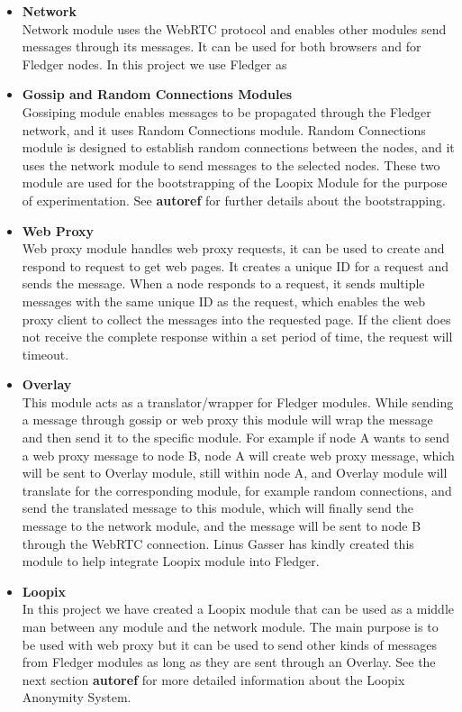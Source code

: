 \documentclass[a4paper,11pt,oneside]{report}
\begin{document}
\begin{itemize}
    \item \textbf{Network}\\
    Network module uses the WebRTC protocol and enables other modules send messages through its messages. It can be used for both browsers and for Fledger nodes. In this project we use Fledger as 
    \item \textbf{Gossip and Random Connections Modules} \\
    Gossiping module enables messages to be propagated through the Fledger network, and it uses Random Connections module. Random Connections module is designed to establish random connections between the nodes, and it uses the network module to send messages to the selected nodes. These two module are used for the bootstrapping of the Loopix Module for the purpose of experimentation. See \textbf{autoref} for further details about the bootstrapping.
    \item \textbf{Web Proxy}\\
    Web proxy module handles web proxy requests, it can be used to create and respond to request to get web pages. It creates a unique ID for a request and sends the message. When a node responds to a request, it sends multiple messages with the same unique ID as the request, which enables the web proxy client to collect the messages into the requested page. If the client does not receive the complete response within a set period of time, the request will timeout.
    \item \textbf{Overlay}\\
    This module acts as a translator/wrapper for Fledger modules. While sending a message through gossip or web proxy this module will wrap the message and then send it to the specific module. For example if node A wants to send a web proxy message to node B, node A will create web proxy message, which will be sent to Overlay module, still within node A, and Overlay module will translate for the corresponding module, for example random connections, and send the translated message to this module, which will finally send the message to the network module, and the message will be sent to node B through the WebRTC connection. Linus Gasser has kindly created this module to help integrate Loopix module into Fledger.
    \item \textbf{Loopix}\\
    In this project we have created a Loopix module that can be used as a middle man between any module and the network module. The main purpose is to be used with web proxy but it can be used to send other kinds of messages from Fledger modules as long as they are sent through an Overlay. See the next section \textbf{autoref} for more detailed information about the Loopix Anonymity System. 
\end{itemize}
\end{document}
